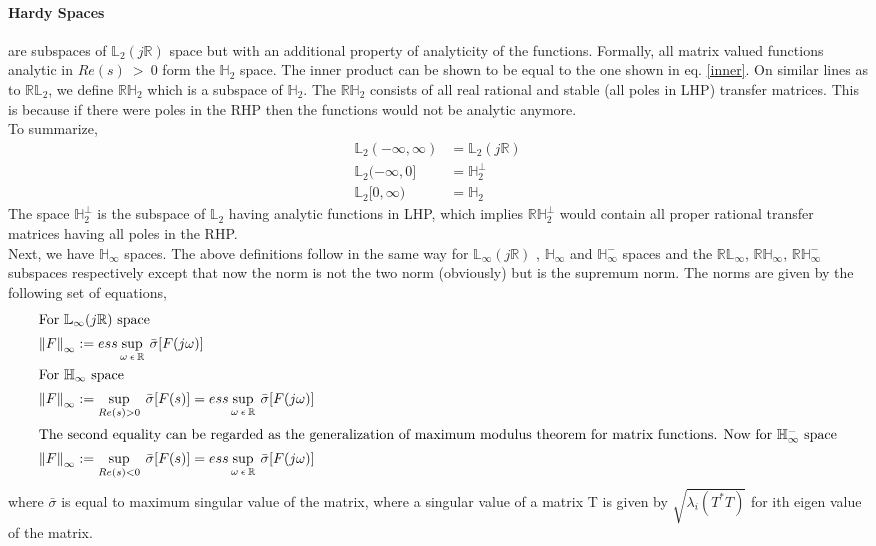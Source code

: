 \documentclass[a4paper,12pt]{article}
\newcommand\norm[1]{\left\lVert#1\right\rVert}
\begin{document}
		\paragraph{Hardy Spaces} are subspaces of $\mathbb{L}_{2}(j\mathbb{R})$ space but with an additional property of analyticity of the functions. Formally, all matrix valued functions analytic in $Re(s)\: > \:0$ form the $\mathbb{H}_{2}$ space. The inner product can be shown to be equal to the one shown in eq. \ref{inner}. On similar lines as to  $\mathbb{RL}_{2}$, we define  $\mathbb{RH}_{2}$ which is a subspace of $\mathbb{H}_{2}$. The $\mathbb{RH}_{2}$ consists of all real rational and stable (all poles in LHP) transfer matrices. This is because if there were poles in the RHP then the functions would not be analytic anymore.\\ To summarize,
		\begin{align*}
		 	\mathbb{L}_{2}(-\infty,\infty) &= \mathbb{L}_{2}(j\mathbb{R}) \\
		 	\mathbb{L}_{2}(-\infty,0] &= \mathbb{H}_{2}^{\perp} \\
		 	\mathbb{L}_{2}[0,\infty) &= \mathbb{H}_{2}
		 \end{align*}
		 The space $\mathbb{H}_{2}^{\perp}$ is the subspace of $\mathbb{L}_{2}$ having analytic functions in LHP, which implies  $\mathbb{RH}_{2}^{\perp}$ would contain all proper rational transfer matrices having all poles in the RHP.
		\\Next, we have  $\mathbb{H}_{\infty}$ spaces. The above definitions follow in the same way for $\mathbb{L}_{\infty}(j\mathbb{R})$ , $\mathbb{H}_{\infty}$ and $\mathbb{H}_{\infty}^{-}$ spaces and the $\mathbb{RL}_{\infty}$, $\mathbb{RH}_{\infty}$, $\mathbb{RH}_{\infty}^{-}$ subspaces respectively except that now the norm is not the two norm (obviously) but is the supremum norm. The norms are given by the following set of equations,
		\begin{align}
		\intertext{For $\mathbb{L}_{\infty}(j\mathbb{R})$ space}
		\norm{F}_{\infty} &:= ess \sup_{\omega\:\epsilon\:\mathbb{R}} \: \bar{\sigma} [F(j\omega)] \\
		\intertext{For $\mathbb{H}_{\infty}$ space}
		\norm{F}_{\infty} &:= \sup_{Re(s) > 0} \: \bar{\sigma} [F(s)] = ess \sup_{\omega\:\epsilon\:\mathbb{R}} \: \bar{\sigma} [F(j\omega)] \\
		\intertext{The second equality can be regarded as the generalization of maximum modulus theorem for matrix functions. Now for $\mathbb{H}_{\infty}^{-}$ space}
		\norm{F}_{\infty} &:= \sup_{Re(s) < 0} \: \bar{\sigma} [F(s)] = ess \sup_{\omega\:\epsilon\:\mathbb{R}} \: \bar{\sigma} [F(j\omega)]
		\end{align}
		where $\bar{\sigma}$ is equal to maximum singular value of the matrix, where a singular value of a matrix T is given by $\sqrt{\lambda_{i}(T^{*}T)}$ for ith eigen value of the matrix.
\end{document}
